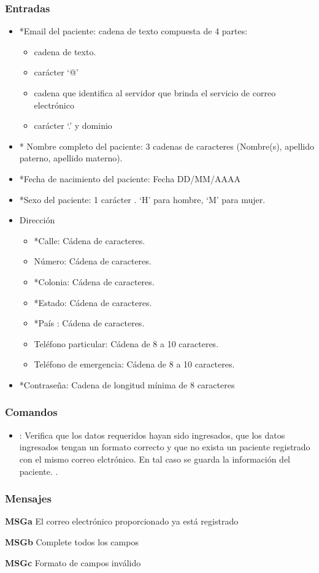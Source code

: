 \subsubsection{Entradas}
\begin{itemize}
	\item *Email del paciente: cadena de texto compuesta de 4 partes:  
	\begin{itemize}
		\item cadena de texto.
		\item carácter ‘@’
		\item cadena que identifica al servidor que brinda el servicio de correo electrónico
		\item carácter ‘.’ y dominio
	\end{itemize}
	\item* Nombre completo del paciente:  3 cadenas de caracteres (Nombre(s), apellido paterno, apellido materno).
	\item *Fecha de nacimiento del paciente: Fecha DD/MM/AAAA
	\item *Sexo del paciente: 1 carácter . ‘H’ para hombre, ‘M’ para mujer.
	\item Dirección
	\begin{itemize}
		\item *Calle: Cádena de caracteres.
		\item Número: Cádena de caracteres.
		\item *Colonia: Cádena de caracteres.
		\item *Estado: Cádena de caracteres.
		\item *País : Cádena de caracteres.
		\item Teléfono particular: Cádena de 8 a 10 caracteres.
		\item Teléfono de emergencia: Cádena de 8 a 10 caracteres.
	\end{itemize}    
	\item *Contraseña:  Cadena de longitud mínima de 8 caracteres
\end{itemize}

\subsubsection{Comandos}
\begin{itemize}
	\item {}:  Verifica que los datos requeridos hayan sido ingresados, que los datos ingresados tengan un formato correcto y que no exista un paciente registrado con el mismo correo elctrónico. En tal caso se guarda la información del paciente.  .	
\end{itemize}

\subsubsection{Mensajes}
\begin{Citemize}
	\item {\bf MSGa} El correo electrónico proporcionado ya está registrado
	\item {\bf MSGb} Complete todos los campos
	\item {\bf MSGc} Formato de campos inválido
\end{Citemize}